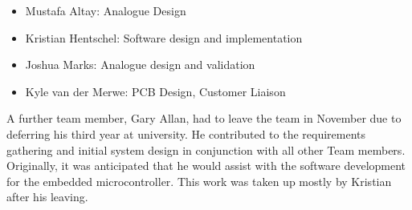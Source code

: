 \begin{itemize}
	\item Mustafa Altay: Analogue Design
	\item Kristian Hentschel: Software design and implementation
	\item Joshua Marks: Analogue design and validation
	\item Kyle van der Merwe: PCB Design, Customer Liaison
\end{itemize}

A further team member, Gary Allan, had to leave the team in November due to deferring his third year at university. He contributed to the requirements gathering and initial system design in conjunction with all other Team members. Originally, it was anticipated that he would assist with the software development for the embedded microcontroller. This work was taken up mostly by Kristian after his leaving.
